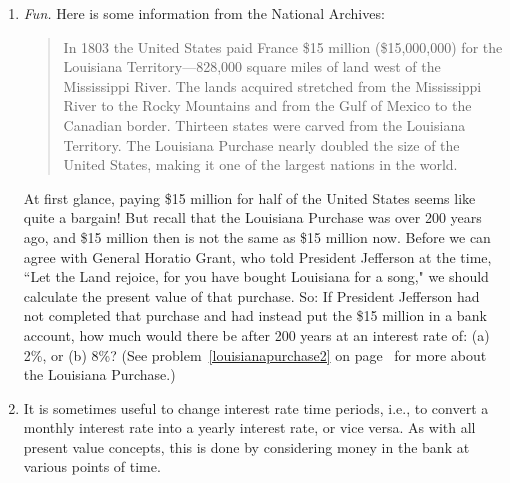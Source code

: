 \begin{enumerate}
\item  \label{louisianapurchase} \emph{Fun.} Here is some information from the National Archives:
\begin{quote}
In 1803 the United States paid France \$15 million (\$15,000,000) for the Louisiana Territory---828,000 square miles of land west of the Mississippi River. The lands acquired stretched from the Mississippi River to the Rocky Mountains and from the Gulf of Mexico to the Canadian border. Thirteen states were carved from the Louisiana Territory. The Louisiana Purchase nearly doubled the size of the United States, making it one of the largest nations in the world.
\end{quote}
At first glance, paying \$15 million for half of the United States seems like quite a bargain! But recall that the Louisiana Purchase was over 200 years ago, and \$15 million then is not the same as \$15 million now. Before we can agree with General Horatio Grant, who told President Jefferson at the time, ``Let the Land rejoice, for you have bought Louisiana for a song," we should calculate the present value of that purchase. So: If President Jefferson had not completed that purchase and had instead put the \$15 million in a bank account, how much would there be after 200 years at an interest rate of: (a) 2\%, or (b) 8\%? (See problem~\ref{louisianapurchase2} on page~\pageref{louisianapurchase2} for more about the Louisiana Purchase.)
















\item \label{monthlyannual} It is sometimes useful to change interest rate time periods, i.e., to convert a monthly interest rate into a yearly interest rate, or vice versa. As with all present value concepts, this is done by considering money in the bank at various points of time.

    \begin{enumerate}


\end{enumerate}
\end{enumerate}
